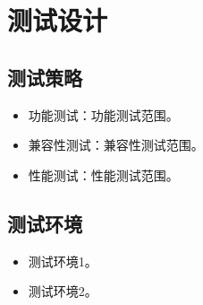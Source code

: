 \documentclass[a4paper,12pt]{article}
\begin{document}
\section{测试设计}

\subsection{测试策略}

\begin{itemize}[leftmargin=2em]
  \item 功能测试：{{功能测试范围}}。
  \item 兼容性测试：{{兼容性测试范围}}。
  \item 性能测试：{{性能测试范围}}。
\end{itemize}

\subsection{测试环境}

\begin{itemize}[leftmargin=2em]
  \item {{测试环境1}}。
  \item {{测试环境2}}。
\end{itemize}
\end{document}

